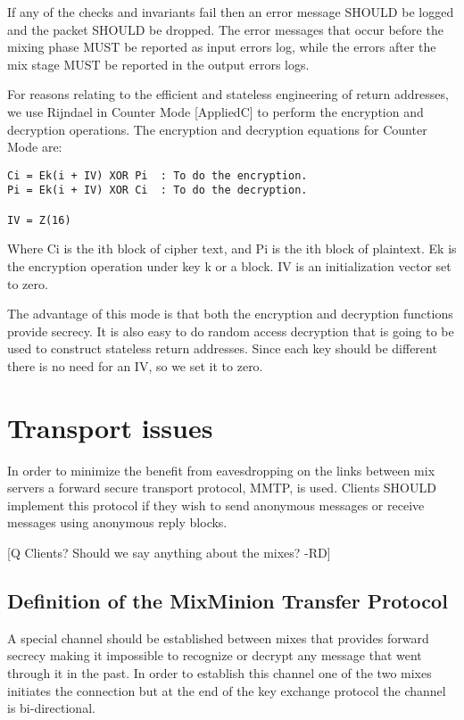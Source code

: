 \documentclass{article}
\begin{document}
If any of the checks and invariants fail then an error message SHOULD
be logged and the packet SHOULD be dropped. The error messages that
occur before the mixing phase MUST be reported as input errors log,
while the errors after the mix stage MUST be reported in the output
errors logs.

For reasons relating to the efficient and stateless engineering of return 
addresses, we use Rijndael in Counter Mode [AppliedC] to perform the 
encryption and decryption operations. The encryption and decryption
equations for Counter Mode are:

\begin{verbatim}
Ci = Ek(i + IV) XOR Pi  : To do the encryption.
Pi = Ek(i + IV) XOR Ci  : To do the decryption.

IV = Z(16)
\end{verbatim}

Where Ci is the ith block of cipher text, and Pi is the ith block of
plaintext. Ek is the encryption operation under key k or a block. IV
is an initialization vector set to zero.

The advantage of this mode is that both the encryption and decryption
functions provide secrecy. It is also easy to do random access
decryption that is going to be used to construct stateless return
addresses. Since each key should be different there is no need for an
IV, so we set it to zero. 

\section{Transport issues}

In order to minimize the benefit from eavesdropping on the links 
between mix servers a forward secure transport protocol, MMTP, is used. 
Clients SHOULD implement this protocol if they wish to send anonymous 
messages or receive messages using anonymous reply blocks.

[Q Clients? Should we say anything about the mixes? -RD]

\subsection{Definition of the MixMinion Transfer Protocol}

A special channel should be established between mixes that provides
forward secrecy making it impossible to recognize or decrypt any
message that went through it in the past. In order to establish this
channel one of the two mixes initiates the connection but at the end
of the key exchange protocol the channel is bi-directional.
\end{document}
